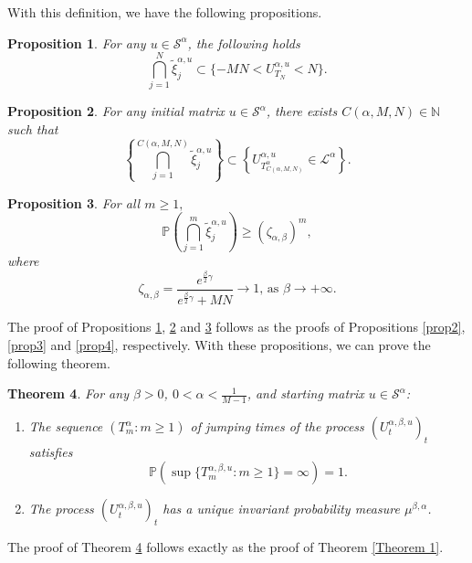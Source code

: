 \documentclass[11pt]{article}
\newtheorem{theorem}{Theorem}
\newtheorem{proposition}[theorem]{Proposition}
\theoremstyle{definition}
\newcommand{\st}{\mathcal{S}}
\begin{document}
With this definition, we have the following propositions.

\begin{proposition} \label{prop2_2}
For any $u\in \st^{\alpha}$, the following holds
$$
 \bigcap_{j=1}^N\tilde{\xi}_j^{\alpha,u}\subset\{-MN<U^{\alpha,u}_{T_N}<N\}.
$$
\end{proposition}

\begin{proposition}\label{prop3_2}
For any initial matrix $u\in\st^{\alpha}$, there exists $C(\alpha,M,N)\in \mathbb{N}$ such that
$$
  \left\{\bigcap_{j=1}^{C(\alpha,M,N)}\tilde{\xi}_j^{\alpha,u}\right\} \subset \left\{U^{\alpha,u}_{T_{C(\alpha,M,N)}^{\alpha}}\in\mathcal{L}^{\alpha} \right\}.
$$
\end{proposition}

\begin{proposition}\label{prop4_2}
    For all $ m\geq 1,$
    $$ \mathbb{P}\left(\bigcap^m_{j=1}\tilde{\xi}_j^{\alpha,u}\right)\geq (\zeta_{\alpha,\beta})^m,
    $$
    where
    $$
        \zeta_{\alpha,\beta}=\frac{e^{\frac{\beta}{2}\gamma}}{e^{\frac{\beta}{2}\gamma}+MN}\rightarrow1\text{, as }\beta\rightarrow+\infty.
    $$
\end{proposition}

The proof of Propositions \ref{prop2_2}, \ref{prop3_2} and \ref{prop4_2} follows as the proofs of Propositions \ref{prop2}, \ref{prop3} and \ref{prop4}, respectively. With these propositions, we can prove the following theorem.

\begin{theorem}\label{Theorem 1_2}
For any $\beta>0$, $0<\alpha<\frac{1}{M-1}$, and starting matrix $u\in\mathcal{S}^{\alpha}$:
    \begin{enumerate}
        \item The sequence $(T_m^{\alpha}:m\geq 1)$ of jumping times of the process $(U^{\alpha,\beta, u}_t)_t$ satisfies
    \[\mathbb{P}(\sup\{T_m^{\alpha,\beta,u}:m\geq 1\} = \infty)=1. \]
        \item The process $(U^{\alpha,\beta,u}_t)_t$ has a unique invariant probability measure $\mu^{\beta, \alpha}$.
    \end{enumerate}
\end{theorem}

The proof of Theorem \ref{Theorem 1_2} follows exactly as the proof of Theorem \ref{Theorem 1}.
\end{document}
